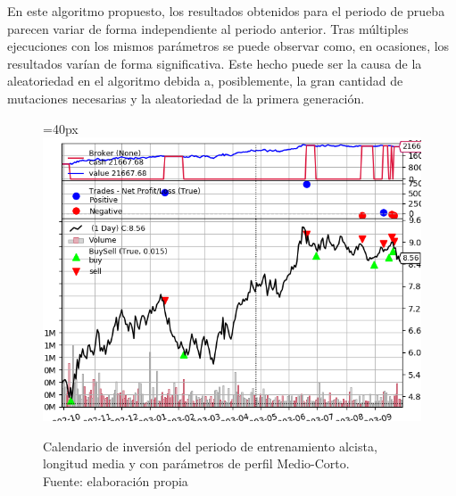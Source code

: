 En este algoritmo propuesto, los resultados obtenidos  para el periodo de prueba parecen variar de forma independiente al periodo anterior. Tras m\'ultiples ejecuciones con los mismos par\'ametros se puede observar como, en ocasiones, los resultados var\'ian de forma significativa. Este hecho puede ser la causa de la aleatoriedad en el algoritmo debida a, posiblemente, la gran cantidad de mutaciones necesarias y la aleatoriedad de la primera generaci\'on.\\

     	\begin{figure}[H]
     		\centering\leftskip=40px
     		\includegraphics[scale=0.66]{imagenes/M_Large-Medium_train.png}
     		\caption[Calendario de inversi\'on del periodo de entrenamiento largo.]{Calendario de inversi\'on del periodo de entrenamiento alcista, longitud media y con par\'ametros de perfil Medio-Corto.\\ Fuente: elaboraci\'on propia}
     		\label{fig:medium_period_mtrain}
     	\end{figure}
     	
